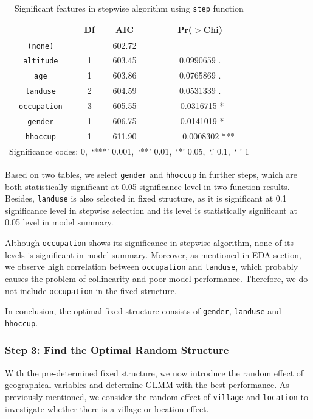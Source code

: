 \documentclass[11pt,twoside]{article}
\numberwithin{Theorem}{section}
\numberwithin{Definition}{section}
\numberwithin{Lemma}{section}
\numberwithin{Algorithm}{section}
\numberwithin{equation}{section}
\begin{document}
\begin{table}[!h]
	\centering
	\begin{tabular}{|c|c|c|c|}
		\hline
		 & Df & AIC & Pr($>$Chi) \\
		\hline
		\texttt{(none)} & & 602.72 & \\                      
		\texttt{altitude} & 1 & 603.45 & 0.0990659 . \\ 
		\texttt{age} & 1 & 603.86 & 0.0765869 . \\ 
		\texttt{landuse} & 2 & 604.59 & 0.0531339 . \\ 
		\texttt{occupation} & 3 & 605.55 & \ 0.0316715 * \\ 
		\texttt{gender} & 1 & 606.75 & \ 0.0141019 * \\ 
		\texttt{hhoccup} & 1 & 611.90 & \ \ \ \ 0.0008302 *** \\
		\hline
		\multicolumn{4}{|l|}{Significance codes: 0,\ ‘***’ 0.001,\ ‘**’ 0.01,\ ‘*’ 0.05,\ ‘.’ 0.1,\ ‘ ’ 1} \\
		\hline
	\end{tabular}
	\caption{Significant features in stepwise algorithm using \texttt{step} function}
	\label{tab:step1}
\end{table}

Based on two tables, we select \texttt{gender} and \texttt{hhoccup} in further steps, which are both statistically significant at 0.05 significance level in two function results. Besides, \texttt{landuse} is also selected in fixed structure,  as it is significant at 0.1 significance level in stepwise selection and its level is statistically significant at 0.05 level in model summary.  

Although \texttt{occupation} shows its significance in stepwise algorithm, none of its levels is significant in model summary. Moreover, as mentioned in EDA section, we observe high correlation between \texttt{occupation} and \texttt{landuse}, which probably causes the problem of collinearity and poor model performance. Therefore, we do not include \texttt{occupation} in the fixed structure.

In conclusion, the optimal fixed structure consists of \texttt{gender}, \texttt{landuse} and \texttt{hhoccup}.

\subsubsection{Step 3: Find the Optimal Random Structure}

With the pre-determined fixed structure, we now introduce the random effect of geographical variables and determine GLMM with the best performance. As previously mentioned, we consider the random effect of \texttt{village} and \texttt{location} to investigate whether there is a village or location effect. 
\end{document}
